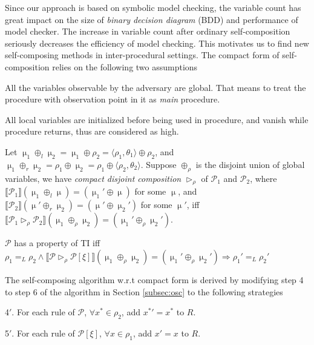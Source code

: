 \documentclass{llncs}
\begin{document}
Since our approach is based on symbolic model checking, the variable
count has great impact on the size of \emph{binary decision diagram}
(BDD) and performance of model checker. The increase in variable
count after ordinary self-composition seriously decreases the
efficiency of model checking. This motivates us to find new
self-composing methods in inter-procedural settings. The compact
form of self-composition relies on the following two assumptions
\begin{compactitem}
\item All the variables observable by the adversary are global. That
means to treat the procedure with observation point in it as
\emph{main} procedure.
\item All local variables are initialized before being used
in procedure, and vanish while procedure returns, thus are
considered as \textsf{high}.
\end{compactitem}
Let
$\upmu_1\oplus_l\upmu_2=\upmu_1\oplus\rho_2=\langle\rho_1,\theta_1\rangle\oplus\rho_2$,
and $\upmu_1\oplus_r\upmu_2=\rho_1\oplus\upmu_2=\rho_1\oplus\langle
\rho_2,\theta_2\rangle$. Suppose $\oplus_\rho$ is the disjoint union
of global variables, we have \emph{compact disjoint composition}
$\vartriangleright_\rho$ of $\mathcal{P}_1$ and $\mathcal{P}_2$,
where $\llbracket \mathcal {P}_1\rrbracket(\upmu_1\oplus_l
\upmu)=(\upmu_1'\oplus \upmu)$ for some $\upmu$, and $\llbracket
\mathcal {P}_2\rrbracket(\upmu'\oplus_r \upmu_2)=(\upmu'\oplus
\upmu_2')$ for some $\upmu'$, iff $\llbracket \mathcal
{P}_1\vartriangleright_\rho \mathcal {P}_2\rrbracket
(\upmu_1\oplus_\rho \upmu_2)=(\upmu_1'\oplus_\rho \upmu_2')$.
\begin{definition}
$\mathcal {P}$ has a property of TI iff\\
\hspace*{\fill}$\rho_1 =_L \rho_2 \wedge \llbracket
\mathcal{P}\vartriangleright_\rho \mathcal{P}[\xi]\rrbracket(\upmu_1
\oplus_\rho \upmu_2)=(\upmu_1' \oplus_\rho \upmu_2')\Rightarrow
\rho_1' =_L \rho_2'$\hspace*{\fill}
\end{definition}

The self-composing algorithm w.r.t compact form is derived by
modifying step 4 to step 6 of the algorithm in Section
\ref{subsec:osc} to the following strategies
\begin{compactenum}
\item[4$'$.] For each rule of $\mathcal{P}$, $\forall x^*\in \rho_2$, add
${x^*}'=x^*$ to $R$.
\item[5$'$.] For each rule of $\mathcal{P}[\xi]$, $\forall x\in \rho_1$, add
$x'=x$ to $R$.
\end{compactenum}
\end{document}
